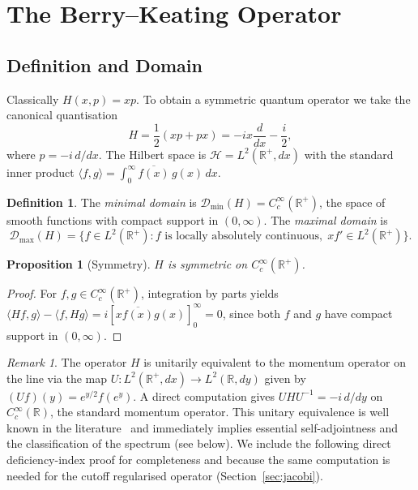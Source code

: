 \documentclass{pre-aomart}
\theoremstyle{plain}
\newtheorem{proposition}[theorem]{Proposition}
\theoremstyle{definition}
\newtheorem{definition}[theorem]{Definition}
\theoremstyle{remark}
\newtheorem{remark}[theorem]{Remark}
\begin{document}
\section{The Berry--Keating Operator}
\label{sec:bk}

\subsection{Definition and Domain}

Classically $H(x,p) = xp$.  To obtain a symmetric quantum operator we take the
canonical quantisation
\begin{equation}\label{eq:H_def}
H = \frac{1}{2}(xp + px) = -i x\frac{d}{dx} - \frac{i}{2},
\end{equation}
where $p = -i\,d/dx$.  The Hilbert space is
$\mathcal{H} = L^2(\mathbb{R}^+, dx)$ with the standard inner product
$\langle f, g\rangle = \int_0^\infty \overline{f(x)}\,g(x)\,dx$.

\begin{definition}\label{def:domain}
The \emph{minimal domain} is $\mathcal{D}_{\min}(H) = C_c^\infty(\mathbb{R}^+)$, the space of
smooth functions with compact support in $(0,\infty)$.  The \emph{maximal domain} is
\[
\mathcal{D}_{\max}(H) = \bigl\{f \in L^2(\mathbb{R}^+) : f \text{ is locally absolutely continuous},\;
                          x f' \in L^2(\mathbb{R}^+)\bigr\}.
\]
\end{definition}

\begin{proposition}[Symmetry]\label{prop:symmetry}
$H$ is symmetric on $C_c^\infty(\mathbb{R}^+)$.
\end{proposition}

\begin{proof}
For $f,g \in C_c^\infty(\mathbb{R}^+)$, integration by parts yields
$\langle Hf, g\rangle - \langle f, Hg\rangle
= i[x\overline{f(x)}g(x)]_0^\infty = 0$,
since both $f$ and $g$ have compact support in $(0,\infty)$.
\end{proof}

\begin{remark}\label{rem:unitary}
The operator $H$ is unitarily equivalent to the momentum operator on the line
via the map $U: L^2(\mathbb{R}^+, dx) \to L^2(\mathbb{R}, dy)$ given by
$(Uf)(y) = e^{y/2}f(e^y)$.  A direct computation gives
$UHU^{-1} = -i\,d/dy$ on $C_c^\infty(\mathbb{R})$, the standard momentum
operator.  This unitary equivalence is well known in the
literature~\cite{Motohashi1997,Connes1999,BerryKeating1999} and immediately
implies essential self-adjointness and the classification of the spectrum
(see below).  We include the following direct deficiency-index proof for
completeness and because the same computation is needed for the
cutoff regularised operator (Section~\ref{sec:jacobi}).
\end{remark}
\end{document}
